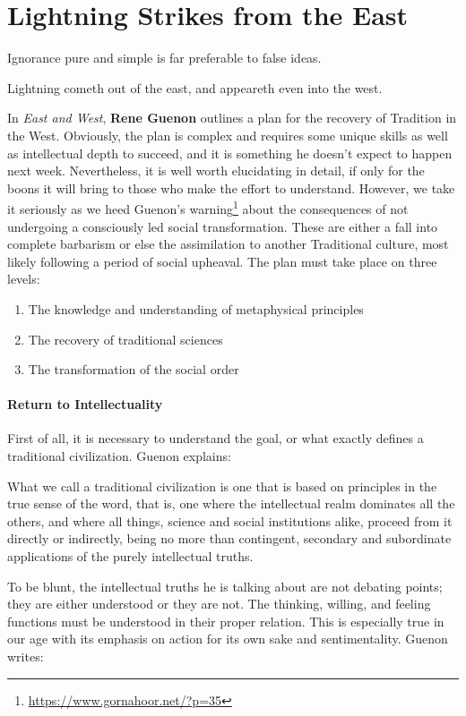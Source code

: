 \section{Lightning Strikes from the East}

\begin{quotex}
Ignorance pure and simple is far preferable to false ideas. 

Lightning cometh out of the east, and appeareth even into the west. 

\end{quotex}
In \textit{East and West}, \textbf{Rene Guenon} outlines a plan for the recovery of Tradition in the West. Obviously, the plan is complex and requires some unique skills as well as intellectual depth to succeed, and it is something he doesn't expect to happen next week. Nevertheless, it is well worth elucidating in detail, if only for the boons it will bring to those who make the effort to understand. However, we take it seriously as we heed Guenon's warning\footnote{\url{https://www.gornahoor.net/?p=35}} about the consequences of not undergoing a consciously led social transformation. These are either a fall into complete barbarism or else the assimilation to another Traditional culture, most likely following a period of social upheaval. The plan must take place on three levels:

\begin{enumerate}
\item The knowledge and understanding of metaphysical principles 
\item The recovery of traditional sciences 
\item The transformation of the social order 
\end{enumerate}
\paragraph{Return to Intellectuality}
First of all, it is necessary to understand the goal, or what exactly defines a traditional civilization. Guenon explains:

\begin{quotex}
What we call a traditional civilization is one that is based on principles in the true sense of the word, that is, one where the intellectual realm dominates all the others, and where all things, science and social institutions alike, proceed from it directly or indirectly, being no more than contingent, secondary and subordinate applications of the purely intellectual truths.

\end{quotex}
To be blunt, the intellectual truths he is talking about are not debating points; they are either understood or they are not. The thinking, willing, and feeling functions must be understood in their proper relation. This is especially true in our age with its emphasis on action for its own sake and sentimentality. Guenon writes:

